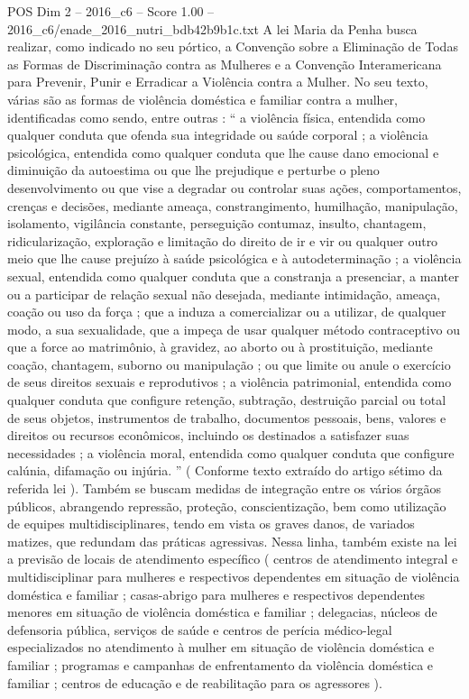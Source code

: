 \begin{textsample}{POS Dim 2 – 2016\_c6 – Score 1.00 – 2016\_c6/enade\_2016\_nutri\_bdb42b9b1c.txt}
A lei Maria da Penha busca realizar, como indicado no seu pórtico, a Convenção sobre a Eliminação de Todas as Formas de Discriminação contra as Mulheres e a Convenção Interamericana para Prevenir, Punir e Erradicar a Violência contra a Mulher.
No seu texto, várias são as formas de violência doméstica e familiar contra a mulher, identificadas como sendo, entre outras : “ a violência física, entendida como qualquer conduta que ofenda sua integridade ou saúde corporal ; a violência psicológica, entendida como qualquer conduta que lhe cause dano emocional e diminuição da autoestima ou que lhe prejudique e perturbe o pleno desenvolvimento ou que vise a degradar ou controlar suas ações, comportamentos, crenças e decisões, mediante ameaça, constrangimento, humilhação, manipulação, isolamento, vigilância constante, perseguição contumaz, insulto, chantagem, ridicularização, exploração e limitação do direito de ir e vir ou qualquer outro meio que lhe cause prejuízo à saúde psicológica e à autodeterminação ; a violência sexual, entendida como qualquer conduta que a constranja a presenciar, a manter ou a participar de relação sexual não desejada, mediante intimidação, ameaça, coação ou uso da força ; que a induza a comercializar ou a utilizar, de qualquer modo, a sua sexualidade, que a impeça de usar qualquer método contraceptivo ou que a force ao matrimônio, à gravidez, ao aborto ou à prostituição, mediante coação, chantagem, suborno ou manipulação ; ou que limite ou anule o exercício de seus direitos sexuais e reprodutivos ; a violência patrimonial, entendida como qualquer conduta que configure retenção, subtração, destruição parcial ou total de seus objetos, instrumentos de trabalho, documentos pessoais, bens, valores e direitos ou recursos econômicos, incluindo os destinados a satisfazer suas necessidades ; a violência moral, entendida como qualquer conduta que configure calúnia, difamação ou injúria. ” ( Conforme texto extraído do artigo sétimo da referida lei ).
Também se buscam medidas de integração entre os vários órgãos públicos, abrangendo repressão, proteção, conscientização, bem como utilização de equipes multidisciplinares, tendo em vista os graves danos, de variados matizes, que redundam das práticas agressivas.
Nessa linha, também existe na lei a previsão de locais de atendimento específico ( centros de atendimento integral e multidisciplinar para mulheres e respectivos dependentes em situação de violência doméstica e familiar ; casas-abrigo para mulheres e respectivos dependentes menores em situação de violência doméstica e familiar ; delegacias, núcleos de defensoria pública, serviços de saúde e centros de perícia médico-legal especializados no atendimento à mulher em situação de violência doméstica e familiar ; programas e campanhas de enfrentamento da violência doméstica e familiar ; centros de educação e de reabilitação para os agressores ).

\end{textsample}
